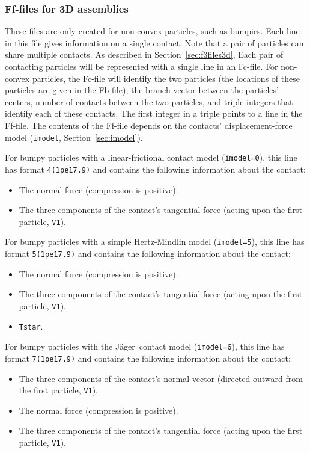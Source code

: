 \documentclass[letterpaper,11pt]{article}
\begin{document}
\subsubsection{Ff-files for 3D assemblies}\label{sec:f6files3d}
These files are only created for non-convex particles, such
as bumpies.
Each line in this file gives information on a single contact.
Note that a pair of particles can share multiple contacts.
As described in Section~\ref{sec:f3files3d},
Each pair of contacting particles will be represented with a 
single line in an Fc-file.
For non-convex particles, the Fc-file will identify the two particles
(the locations of these particles are given in the Fb-file), 
the branch vector between the particles' centers, 
number of contacts between the two particles,
and triple-integers that identify each of these contacts.
The first integer in a triple points to a line in the Ff-file.
The contents of the Ff-file depends on the contacts'
displacement-force model (\texttt{imodel}, Section~\ref{sec:imodel}).
%
\par
For bumpy particles with a linear-frictional contact
model (\texttt{imodel=0}), 
this line has format \texttt{4(1pe17.9)}
and contains the following information about the contact:
\begin{itemize}
\item
The normal force (compression is positive).
\item
The three components of the contact's tangential force
(acting upon the first particle, \texttt{V1}).
\end{itemize}
%
\par
For bumpy particles with a simple Hertz-Mindlin
model (\texttt{imodel=5}), 
this line has format \texttt{5(1pe17.9)}
and contains the following information about the contact:
\begin{itemize}
\item
The normal force (compression is positive).
\item
The three components of the contact's tangential force
(acting upon the first particle, \texttt{V1}).
\item
\texttt{Tstar}.
\end{itemize}
%
\par
For bumpy particles with the J\"{a}ger\ contact
model (\texttt{imodel=6}), 
this line has format \texttt{7(1pe17.9)}
and contains the following information about the contact:
\begin{itemize}
\item
The three components of the contact's normal vector (directed outward
from the first particle, \texttt{V1}).
\item
The normal force (compression is positive).
\item
The three components of the contact's tangential force
(acting upon the first particle, \texttt{V1}).
\end{itemize}
%
%
\end{document}
